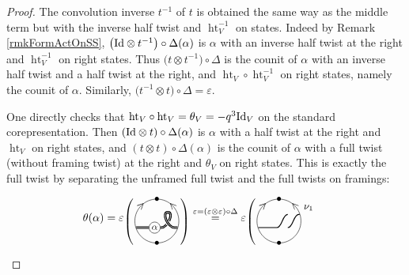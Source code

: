 \documentclass[pdftex]{sigma}%
\numberwithin{equation}{section}
\newcommand{\halft}{{\operatorname{ht}}}
\begin{document}
\begin{proof}
The convolution inverse $t^{-1}$ of $t$ is obtained the same way as the middle term but with the inverse half twist and $\halft_V^{-1}$ on states. Indeed by Remark \ref{rmkFormActOnSS}, $\big({\rm Id} \otimes t^{-1}\big) \circ \Delta(\alpha)$ is $\alpha$ with an inverse half twist at the right and $\halft_V^{-1}$ on right states. Thus $\big(t\otimes t^{-1}\big)\circ \Delta$ is the counit of $\alpha$ with an inverse half twist and a half twist at the right, and $\halft_V\circ\halft_V^{-1}$ on right states, namely the counit of $\alpha$. Similarly, $\big(t^{-1}\otimes t\big)\circ\Delta=\varepsilon$.

One directly checks that $\halft_V \circ \halft_V = \theta_V = -q^3 {\rm Id}_V$ on the standard corepresentation. Then $({\rm Id}\otimes t)\circ \Delta (\alpha)$ is $\alpha$ with a half twist at the right and $\halft_V$ on right states, and $(t\otimes t)\circ \Delta (\alpha)$ is the counit of $\alpha$ with a full twist (without framing twist) at the right and $\theta_V$ on right states. This is exactly the full twist by separating the unframed full twist and the full twists on framings:
\begin{align*}
\theta(\alpha) & =\varepsilon\raisebox{-3pt}{$\left(\rule{0pt}{24pt}\right.$}\!\! \begin{tikzpicture}[scale = 0.7, baseline = 0pt]
\draw (0,-1) node{\small $\bullet$} arc(-90:90:1) node[near end, sloped]{\small $<$} node{\small $\bullet$};
\draw (0,-1) arc(-90:-270:1) node[near end, sloped]{\small $>$};
\node[circle, draw = black, scale = 0.85, inner sep = 1.5pt] (X) at (-0.1,-0.3){$\alpha$};
\draw[thick, double] (-0.94,-0.3) -- (X) -- (0.2,-0.3) .. controls (0.5,-0.3) and (0.8,0.4).. (0.5,0.4) node[pos = 0.37, circle, fill = white, scale = 0.46]{};
\draw[thick, double] (0.5,0.4).. controls (0.2,0.4) and (0.5,-0.3) .. (0.8,-0.3) -- (0.94,-0.3);
\end{tikzpicture}\!\!
\raisebox{-3pt}{$\left.\rule{0pt}{24pt}\right)$}
 \overset{\varepsilon = (\varepsilon\otimes \varepsilon)\circ \Delta}=
\varepsilon\raisebox{-3pt}{$\left(\rule{0pt}{24pt}\right.$}\!\!
\begin{tikzpicture}[scale = 0.7, baseline = 0pt]
\draw (0,-1) node{\small $\bullet$} arc(-90:90:1) node[near end, sloped]{\small $<$} node{\small $\bullet$};
\draw (0,-1) arc(-90:-270:1) node[near end, sloped]{\small $>$};
\draw[thick] (-0.94,-0.3) -- (-0.1,-0.3) .. controls (0.15,-0.3) and (0.15,0.3).. (0.4,0.3);
\draw[thick] (0.4,-0.3) .. controls (0.65,-0.3) and (0.65,0.3).. (0.9,0.3) -- (0.94,0.3)node[above right]{\small $\nu_1$};

\end{tikzpicture}
\end{align*}
\end{proof}
\end{document}
